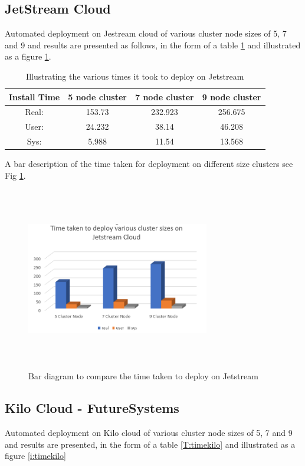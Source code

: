 \documentclass[9pt,twocolumn,twoside]{../../styles/osajnl}
\begin{document}
\subsection{JetStream Cloud}
Automated deployment on Jestream cloud of various cluster node sizes of 5, 7 and 
9 and results are presented as follows, in the form of a table \ref{T:timejet} and 
illustrated as a figure \ref{i:barjet}.

\begin{table}[!htb]
\centering
\caption{Illustrating the various times it took to deploy on Jetstream}\label{T:timejet}
 \begin{tabular}{|c|| c c c|} 
 \hline
 Install Time &  5 node cluster & 7 node cluster & 9 node cluster\\ [0.5ex]
 \hline\hline
 Real: &153.73 &232.923 & 256.675 \\ 
 \hline
 User: & 24.232 & 38.14 & 46.208 \\
 \hline
 Sys: & 5.988 &11.54 & 13.568  \\
 \hline
\end{tabular}
\end{table}

A bar description of the time taken for deployment on different size 
clusters see Fig \ref{i:barjet}.

\begin{figure}[!htb]
  \includegraphics[width=8cm,height=8cm,keepaspectratio,width=\linewidth]{images/bar-2.png}
  \caption{Bar diagram to compare the time taken to deploy on Jetstream }
  \label{i:barjet}
\end{figure}

\subsection{Kilo Cloud - FutureSystems}
Automated deployment on Kilo cloud of various cluster node sizes
of 5, 7 and 9 and results are presented, in the form of a table
\ref{T:timekilo} and illustrated as a figure \ref{i:timekilo}
\end{document}
